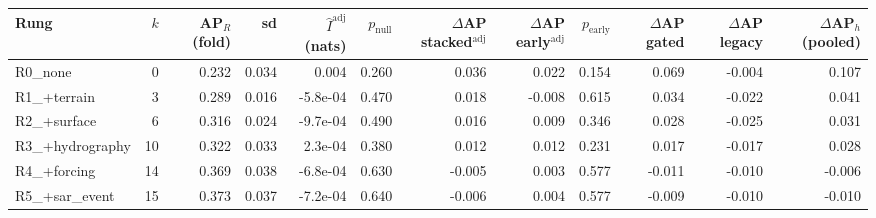 \begin{tabular}{lrrrrrrrrrrr}
\toprule
Rung & $k$ & AP$_R$ (fold) & sd & $\hat I^{\mathrm{adj}}$ (nats) & $p_{\mathrm{null}}$ & $\Delta$AP stacked$^{\mathrm{adj}}$ & $\Delta$AP early$^{\mathrm{adj}}$ & $p_{\mathrm{early}}$ & $\Delta$AP gated & $\Delta$AP legacy & $\Delta$AP$_h$ (pooled) \\
\midrule
R0\_none & 0 & 0.232 & 0.034 & 0.004 & 0.260 & 0.036 & 0.022 & 0.154 & 0.069 & -0.004 & 0.107 \\
R1\_+terrain & 3 & 0.289 & 0.016 & -5.8e-04 & 0.470 & 0.018 & -0.008 & 0.615 & 0.034 & -0.022 & 0.041 \\
R2\_+surface & 6 & 0.316 & 0.024 & -9.7e-04 & 0.490 & 0.016 & 0.009 & 0.346 & 0.028 & -0.025 & 0.031 \\
R3\_+hydrography & 10 & 0.322 & 0.033 & 2.3e-04 & 0.380 & 0.012 & 0.012 & 0.231 & 0.017 & -0.017 & 0.028 \\
R4\_+forcing & 14 & 0.369 & 0.038 & -6.8e-04 & 0.630 & -0.005 & 0.003 & 0.577 & -0.011 & -0.010 & -0.006 \\
R5\_+sar\_event & 15 & 0.373 & 0.037 & -7.2e-04 & 0.640 & -0.006 & 0.004 & 0.577 & -0.009 & -0.010 & -0.010 \\
\bottomrule
\end{tabular}

